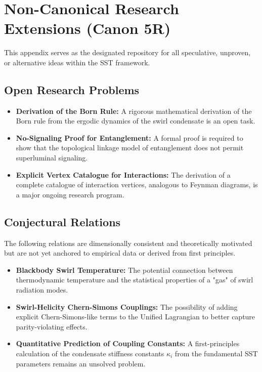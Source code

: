 \documentclass[11pt]{article}
\begin{document}
\section{Non-Canonical Research Extensions (Canon 5R)}
This appendix serves as the designated repository for all speculative, unproven, or alternative ideas within the SST framework.

\subsection{Open Research Problems}
    \begin{itemize}
    \item \textbf{Derivation of the Born Rule:} A rigorous mathematical derivation of the Born rule from the ergodic dynamics of the swirl condensate is an open task.
    \item \textbf{No-Signaling Proof for Entanglement:} A formal proof is required to show that the topological linkage model of entanglement does not permit superluminal signaling.
    \item \textbf{Explicit Vertex Catalogue for Interactions:} The derivation of a complete catalogue of interaction vertices, analogous to Feynman diagrams, is a major ongoing research program.
    \end{itemize}

\subsection{Conjectural Relations}
    The following relations are dimensionally consistent and theoretically motivated but are not yet anchored to empirical data or derived from first principles.
    \begin{itemize}
    \item \textbf{Blackbody Swirl Temperature:} The potential connection between thermodynamic temperature and the statistical properties of a "gas" of swirl radiation modes.
    \item \textbf{Swirl-Helicity Chern-Simons Couplings:} The possibility of adding explicit Chern-Simons-like terms to the Unified Lagrangian to better capture parity-violating effects.
    \item \textbf{Quantitative Prediction of Coupling Constants:} A first-principles calculation of the condensate stiffness constants $\kappa_i$ from the fundamental SST parameters remains an unsolved problem.
    \end{itemize}
\end{document}
